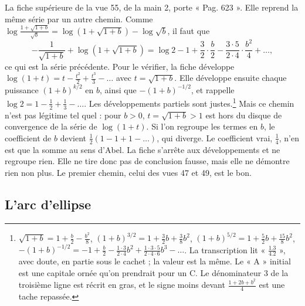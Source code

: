 \documentclass[11pt,a4paper]{article}
\begin{document}
La fiche supérieure de la vue 55, de la main 2, porte « Pag. 623 ». Elle
reprend la même série par un autre chemin. Comme \(\log\frac{1+\sqrt{1+b}}{\sqrt b}
=\log(1+\sqrt{1+b})-\log\sqrt b\), il faut que
\[
-\frac1{\sqrt{1+b}}+\log(1+\sqrt{1+b})=\log2-1+\frac32\cdot\frac b2-\frac{3\cdot5}{2\cdot4}\cdot\frac{b^2}{4}+\dots,
\]
ce qui est la série précédente. Pour le vérifier, la fiche développe
\(\log(1+t)=t-\frac{t^2}{2}+\frac{t^3}{3}-\dots\) avec \(t=\sqrt{1+b}\). Elle
développe ensuite chaque puissance \((1+b)^{k/2}\) en \(b\), ainsi que
\(-(1+b)^{-1/2}\), et rappelle \(\log2=1-\frac12+\frac13-\dots\). Les
développements partiels sont justes.\footnote{\(\sqrt{1+b}=1+\frac b2-\frac{b^2}{8}\),
\((1+b)^{3/2}=1+\frac32b+\frac38b^2\), \((1+b)^{5/2}=1+\frac52b+\frac{15}{8}b^2\),
\(-(1+b)^{-1/2}=-1+\frac b2-\frac{1\cdot3}{2\cdot4}b^2+\frac{1\cdot3\cdot5}{2\cdot4\cdot6}b^3-\dots\).
La transcription lit « \(\frac{1.3}{4.2}\) », avec doute, en partie sous le
cachet ; la valeur est la même. Le « A » initial est une capitale ornée qu'on
prendrait pour un C. Le dénominateur 3 de la troisième ligne est récrit en
gras, et le signe moins devant \(\frac{1+2b+b^2}{4}\) est une tache repassée.}
Mais ce chemin n'est pas légitime tel quel : pour \(b>0\), \(t=\sqrt{1+b}>1\)
est hors du disque de convergence de la série de \(\log(1+t)\). Si l'on
regroupe les termes en \(b\), le coefficient de \(b\) devient
\(\frac12(1-1+1-\dots)\), qui diverge. Le coefficient vrai, \(\frac14\), n'en
est que la somme au sens d'Abel. La fiche s'arrête aux développements et ne
regroupe rien. Elle ne tire donc pas de conclusion fausse, mais elle ne
démontre rien non plus. Le premier chemin, celui des vues 47 et 49, est le
bon.

\subsection*{L'arc d'ellipse}
\end{document}
